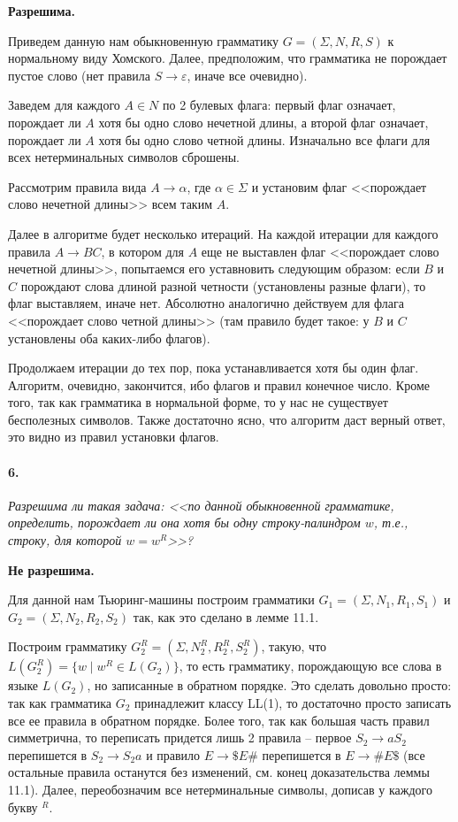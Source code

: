 \documentclass[russian,table]{article}
\begin{document}
\textbf{Разрешима.}

Приведем данную нам обыкновенную грамматику $G = (\Sigma,N,R,S)$ к нормальному виду Хомского. Далее, предположим, что грамматика не порождает пустое слово (нет правила $S \to \varepsilon$, иначе все очевидно).

Заведем для каждого $A \in N$ по 2 булевых флага: первый флаг означает, порождает ли $A$ хотя бы одно слово нечетной длины, а второй флаг означает, порождает ли $A$ хотя бы одно слово четной длины. Изначально все флаги для всех нетерминальных символов сброшены.

Рассмотрим правила вида $A \to \alpha$, где $\alpha \in \Sigma$ и установим флаг <<порождает слово нечетной длины>> всем таким $A$.

Далее в алгоритме будет несколько итераций. На каждой итерации для каждого правила $A \to BC$, в котором для $A$ еще не выставлен флаг <<порождает слово нечетной длины>>, попытаемся его уставновить следующим образом: если $B$ и $C$ порождают слова длиной разной четности (установлены разные флаги), то флаг выставляем, иначе нет. Абсолютно аналогично действуем для флага <<порождает слово четной длины>> (там правило будет такое: у $B$ и $C$ установлены оба каких-либо флагов).

Продолжаем итерации до тех пор, пока устанавливается хотя бы один флаг. Алгоритм, очевидно, закончится, ибо флагов и правил конечное число. Кроме того, так как грамматика в нормальной форме, то у нас не существует бесполезных символов.
Также достаточно ясно, что алгоритм даст верный ответ, это видно из правил установки флагов.

\paragraph*{6.} \textit{Разрешима ли такая задача: <<по данной обыкновенной грамматике, определить, порождает ли она хотя бы одну строку-палиндром $w$, т.е., строку, для которой $w = w^R$>>?}

\textbf{Не разрешима.}

Для данной нам Тьюринг-машины построим грамматики $G_1 = (\Sigma, N_1, R_1, S_1)$ и $G_2 = (\Sigma, N_2, R_2, S_2)$ так, как это сделано в лемме 11.1.

Построим грамматику $G_2^R = (\Sigma, N_2^R, R_2^R, S_2^R)$, такую, что $L(G_2^R) = \{ w \mid w^R \in L(G_2) \}$, то есть грамматику, порождающую все слова в языке $L(G_2)$, но записанные в обратном порядке. Это сделать довольно просто: так как грамматика $G_2$ принадлежит классу LL(1), то достаточно просто записать все ее правила в обратном порядке. Более того, так как большая часть правил симметрична, то переписать придется лишь 2 правила -- первое $S_2 \to aS_2$ перепишется в $S_2 \to S_2a$ и правило $E \to \$E\#$ перепишется в $E \to \#E\$$ (все остальные правила останутся без изменений, см. конец доказательства леммы 11.1). Далее, переобозначим все нетерминальные символы, дописав у каждого букву $^R$.
\end{document}
